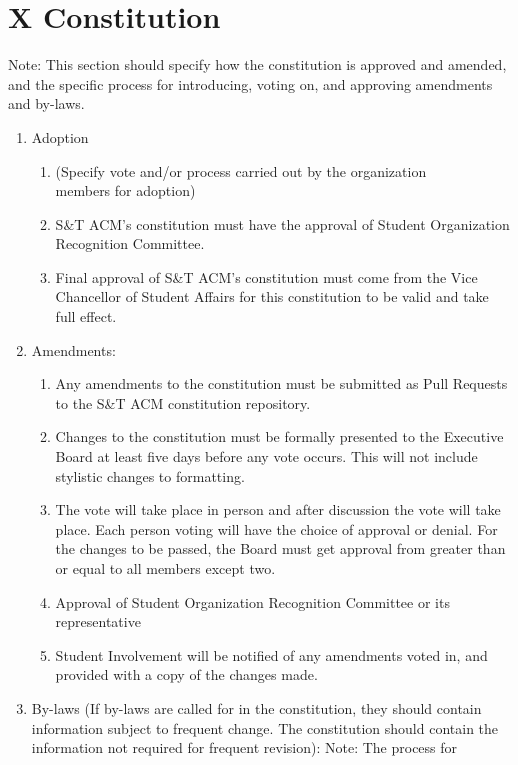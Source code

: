 
\section{X \textendash{} Constitution}
Note:  This section should specify how the constitution is approved and amended,
and the specific process for introducing, voting on, and approving amendments
and by-laws.
\begin{enumerate}
  \item Adoption
    \begin{enumerate}
      \item (Specify vote and/or process carried out by the organization\\
      members for adoption)
      \item	S\&T ACM’s constitution must have the approval of Student
      Organization Recognition Committee.
      \item	Final approval of S\&T ACM’s constitution must come from the
      Vice Chancellor of Student Affairs for this constitution to be valid and
      take full effect.
    \end{enumerate}
  \item	Amendments:
    \begin{enumerate}
      \item Any amendments to the constitution must be submitted as Pull
      Requests to the S\&T ACM constitution repository.
      \item Changes to the constitution must be formally presented to the
      Executive Board at least five days before any vote occurs. This will not
      include stylistic changes to formatting.
      \item The vote will take place in
      person and after discussion the vote will take place. Each person voting
      will have the choice of approval or denial. For the changes to be
      passed, the Board must get approval from greater than or equal to all
      members except two.
      \item	Approval of Student Organization Recognition Committee or its
      representative
      \item	Student Involvement will be notified of any amendments voted in, and
      provided with a copy of the changes made.
    \end{enumerate}
  \item	By-laws (If by-laws are called for in the constitution, they should
contain information subject to frequent change.  The constitution should contain
the information not required for frequent revision): Note:  The process for

\end{enumerate}
